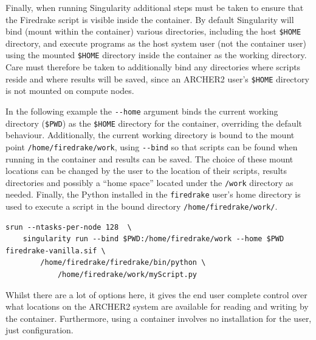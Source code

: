 \documentclass[a4paper,11pt]{article}
\begin{document}
Finally, when running Singularity additional steps must be taken to ensure that the Firedrake script is visible inside the container.
By default Singularity will bind (mount within the container) various directories, including the host \verb`$HOME` directory, and execute programs as the host system user (not the container user) using the mounted \verb`$HOME` directory inside the container as the working  directory.
Care must therefore be taken to additionally bind any directories where scripts reside and where results will be saved, since an ARCHER2 user's \verb`$HOME` directory is not mounted on compute nodes.

In the following example the \verb`--home` argument binds the current working directory (\verb`$PWD`) as the \verb`$HOME` directory for the container, overriding the default behaviour.
Additionally, the current working directory is bound to the mount point \verb`/home/firedrake/work`, using \verb`--bind` so that scripts can be found when running in the container and results can be saved.
The choice of these mount locations can be changed by the user to the location of their scripts, results directories and possibly a ``home space'' located under the \verb`/work` directory as needed.
Finally, the Python installed in the \verb`firedrake` user's home directory is used to execute a script in the bound directory \verb`/home/firedrake/work/`.

\begin{lstlisting}
srun --ntasks-per-node 128  \
    singularity run --bind $PWD:/home/firedrake/work --home $PWD firedrake-vanilla.sif \
        /home/firedrake/firedrake/bin/python \
            /home/firedrake/work/myScript.py
\end{lstlisting}
Whilst there are a lot of options here, it gives the end user complete control over what locations on the ARCHER2 system are available for reading and writing by the container.
Furthermore, using a container involves no installation for the user, just configuration.
\end{document}
